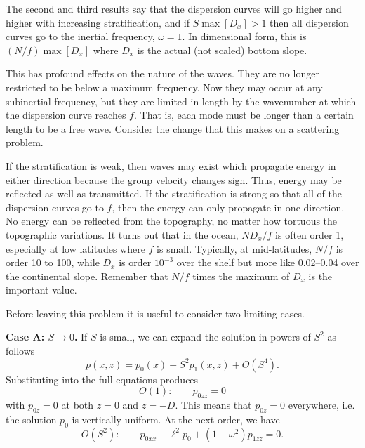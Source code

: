 The second and third results say that the dispersion curves will go higher and higher
with increasing stratification, and if $S\max[D_x]>1$ then all dispersion curves go to
the inertial frequency, $\omega=1$. In dimensional form, this is
$(N/f)\max[D_x]$ where $D_x$ is the actual (not scaled) bottom slope.


This has profound effects on the nature of the waves. They are no longer restricted to
be below a maximum frequency. Now they may occur at any subinertial frequency, but
they are limited in length by the wavenumber at which the dispersion curve reaches
$f$. That is, each mode must be longer than a certain length to be a free wave. Consider
the change that this makes on a scattering problem.

\sourcepagebreak


If the stratification is weak, then waves may exist which propagate energy in either
direction because the group velocity changes sign. Thus, energy may be reflected as
well as transmitted. If the stratification is strong so that all of the dispersion curves
go to $f$, then the energy can only propagate in one direction. No energy can be
reflected from the topography, no matter how tortuous the topographic variations. It
turns out that in the ocean, $ND_x/f$ is often order 1, especially at low latitudes where
$f$ is small. Typically, at mid-latitudes, $N/f$ is order 10 to 100, while $D_x$ is order
$10^{-3}$ over the shelf but more like 0.02--0.04 over the continental slope. Remember
that $N/f$ times the maximum of $D_x$ is the important value.

Before leaving this problem it is useful to consider two limiting cases.

\noindent\textbf{Case A: $S\to0$.} If $S$ is small, we can expand the solution in
powers of $S^2$ as follows
\[
	p(x,z)=p_0(x)+S^2p_1(x,z)+O(S^4).
\]
Substituting into the full equations produces
\[
	O(1):\qquad p_{0zz}=0
\]
with $p_{0z}=0$ at both $z=0$ and $z=-D$. This means that $p_{0z}=0$ everywhere,
i.e. the solution $p_0$ is vertically uniform. At the next order, we have
\[
	O(S^2):\qquad p_{0xx}-\ell^2p_0+(1-\omega^2)p_{1zz}=0.
\]

